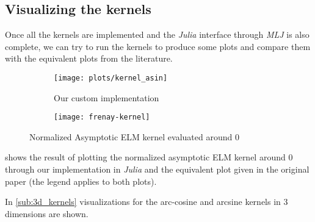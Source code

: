 
\subsection{Visualizing the kernels}

Once all the kernels are implemented and the \emph{Julia} interface through
\emph{MLJ} is also complete, we can try to run the kernels to produce some
plots and compare them with the equivalent plots from the literature.

\begin{figure}[H]
    \begin{subfigure}{.59\textwidth}
        \texttt{[image: plots/kernel\_asin]}
        \caption{Our custom implementation}
    \end{subfigure} \begin{subfigure}{.40\textwidth}
        \texttt{[image: frenay-kernel]}
        \caption{\textcite{frenayParameterinsensitiveKernelExtreme2011}}
    \end{subfigure}
    \caption{Normalized Asymptotic ELM kernel evaluated around 0}
    \label{fig:kernel_asin_comparison}
\end{figure}

 shows the result of plotting the normalized
asymptotic ELM kernel around 0 through our implementation in \emph{Julia} and
the equivalent plot given in the original paper (the legend applies to both
plots).

In \cref{sub:3d_kernels} visualizations for the arc-cosine and arcsine kernels
in 3 dimensions are shown.

%

%
%


